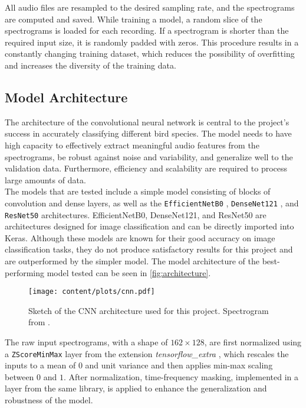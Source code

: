 All audio files are resampled to the desired sampling rate, and the spectrograms are computed and saved. While training a model, a random slice of the spectrograms is loaded for 
each recording. If a spectrogram is shorter than the required input size, it is randomly padded with zeros. This procedure results in a constantly changing training dataset, 
which reduces the possibility of overfitting and increases the diversity of the training data.

\subsection{Model Architecture}
\label{subsec:architecture}
The architecture of the convolutional neural network is central to the project's success in accurately classifying different bird species. 
The model needs to have high capacity to effectively extract meaningful audio features from the spectrograms, be robust against noise and variability, 
and generalize well to the validation data. Furthermore, efficiency and scalability are required to process large amounts of data. \\
The models that are tested include a simple model consisting of blocks of convolution and dense layers, as well as the \texttt{EfficientNetB0} \cite{tan2019efficientnet}, 
\texttt{DenseNet121} \cite{huang2017densely}, and \texttt{ResNet50} \cite{he2016deep} architectures. EfficientNetB0, DenseNet121, and ResNet50 are architectures 
designed for image classification and can be directly imported into Keras. Although these models are known for their good accuracy on image classification tasks, 
they do not produce satisfactory results for this project and are outperformed by the simpler model. 
The model architecture of the best-performing model tested can be seen in \autoref{fig:architecture}.
\begin{figure}
    \centering
    \texttt{[image: content/plots/cnn.pdf]}
    \caption{Sketch of the CNN architecture used for this project. Spectrogram from \cite{audio3}.}
    \label{fig:architecture}
\end{figure}
The raw input spectrograms, with a shape of $162 \times 128$, are first normalized using a \texttt{ZScoreMinMax} layer from the extension \textit{tensorflow\_extra} 
\cite{tensorflow_extra}, which rescales the inputs to a mean of $0$ and unit variance and then applies min-max scaling between $\num{0}$ and $\num{1}$. 
After normalization, time-frequency masking, implemented in a layer from the same library, is applied to enhance the generalization and robustness of the model. 

